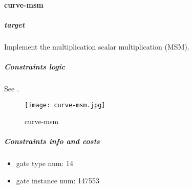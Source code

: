 \paragraph{curve-msm}

\subparagraph{target}
Implement the multiplication scalar multiplication (MSM).

\subparagraph{Constraints logic}
See .
\begin{figure}[!ht]
    \centering
    \texttt{[image: curve-msm.jpg]}
    \caption{curve-msm}
    \label{fig:curve-msm}
\end{figure}

\subparagraph{Constraints info and costs}
\begin{itemize}
    \item gate type num: 14
    \item gate instance num: 147553
\end{itemize}
